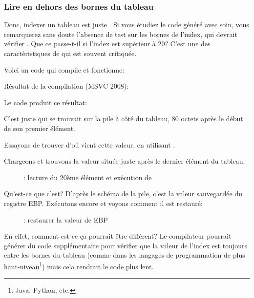 \subsubsection{Lire en dehors des bornes du tableau}

Donc, indexer un tableau est juste .
Si vous étudiez le code généré avec soin, vous remarquerez sans doute l'absence de
test sur les bornes de l'index, qui devrait vérifier .
Que ce passe-t-il si l'index est supérieur à 20?
C'est une des caractèristiques de \CCpp qui est souvent critiquée.

Voici un code qui compile et fonctionne:



Résultat de la compilation (MSVC 2008):



Le code produit ce résultat:



C'est juste  qui se trouvait sur la pile à côté du tableau, 80 octets
après le début de son premier élément.

\clearpage
\myindex{\olly}
Essayons de trouver d'oú vient cette valeur, en utilisant \olly.

Chargeons et trouvons la valeur située juste après le dernier élément du tableau:

\begin{figure}[H]
\centering
{}
\caption{\olly: lecture du 20ème élément et exécution de \printf}
\label{fig:array_BO_olly_r1}
\end{figure}

Qu'est-ce que c'est?
D'après le schéma de la pile, c'est la valeur sauvegardée du registre EBP.
\clearpage
Exécutons encore et voyons comment il est restauré:

\begin{figure}[H]
\centering
{}
\caption{\olly: restaurer la valeur de EBP}
\label{fig:array_BO_olly_r2}
\end{figure}

En effet, comment est-ce ça pourrait être différent?
Le compilateur pourrait générer du code supplémentaire pour vérifier que la valeur
de l'index est toujours entre les bornes du tableau (comme dans les langages de
programmation de plus haut-niveau\footnote{Java, Python, etc.}) mais cela rendrait
le code plus lent.

